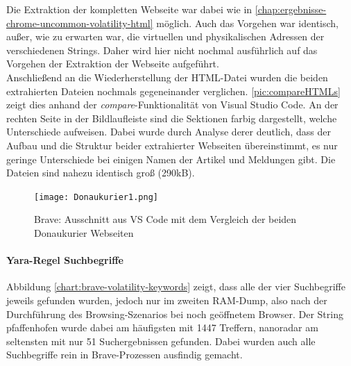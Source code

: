 Die Extraktion der kompletten Webseite war dabei wie in \autoref{chap:ergebnisse-chrome-uncommon-volatility-html} möglich. Auch das Vorgehen war identisch, außer, wie zu erwarten war, die virtuellen und physikalischen Adressen der verschiedenen Strings. Daher wird hier nicht nochmal ausführlich auf das Vorgehen der Extraktion der Webseite aufgeführt.\\
Anschließend an die Wiederherstellung der HTML-Datei wurden die beiden extrahierten Dateien nochmals gegeneinander verglichen. \autoref{pic:compareHTMLs} zeigt dies anhand der \textit{compare}-Funktionalität von Visual Studio Code. An der rechten Seite in der Bildlaufleiste sind die Sektionen farbig dargestellt, welche Unterschiede aufweisen. Dabei wurde durch Analyse derer deutlich, dass der Aufbau und die Struktur beider extrahierter Webseiten übereinstimmt, es nur geringe Unterschiede bei einigen Namen der Artikel und Meldungen gibt. Die Dateien sind nahezu identisch groß (290kB).

\begin{figure}[h!]
	\centering
	\texttt{[image: Donaukurier1.png]}
	\caption{Brave: Ausschnitt aus VS Code mit dem Vergleich der beiden Donaukurier Webseiten}
	\label{pic:compareHTMLs}
\end{figure}

\paragraph*{Yara-Regel \glqq{}Suchbegriffe\grqq{}}\label{chap:ergebnisse-brave-uncommon-locations-volatility-suchbegriffe}  
Abbildung \ref{chart:brave-volatility-keywords} zeigt, dass alle der vier Suchbegriffe jeweils gefunden wurden, jedoch nur im zweiten RAM-Dump, also nach der Durchführung des Browsing-Szenarios bei noch geöffnetem Browser. Der String \glqq{}pfaffenhofen\grqq{} wurde dabei am häufigsten mit 1447 Treffern, \glqq{}nanoradar\grqq{} am seltensten mit nur 51 Suchergebnissen gefunden. Dabei wurden auch alle Suchbegriffe rein in Brave-Prozessen ausfindig gemacht.

